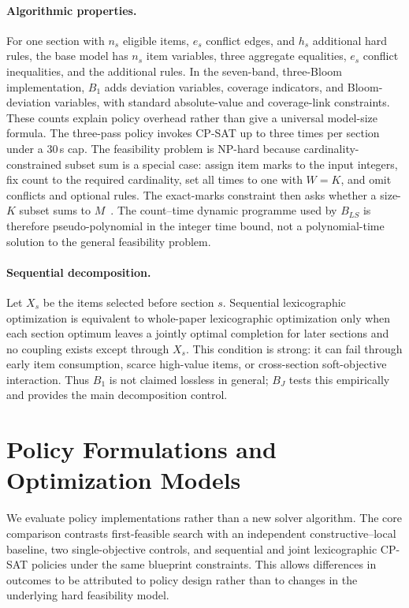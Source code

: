 \documentclass[runningheads]{llncs}
\begin{document}
\paragraph{Algorithmic properties.}
For one section with $n_s$ eligible items, $e_s$ conflict edges, and $h_s$ additional hard rules, the base model has $n_s$ item variables, three aggregate equalities, $e_s$ conflict inequalities, and the additional rules. In the seven-band, three-Bloom implementation, $B_1$ adds deviation variables, coverage indicators, and Bloom-deviation variables, with standard absolute-value and coverage-link constraints. These counts explain policy overhead rather than give a universal model-size formula. The three-pass policy invokes CP-SAT up to three times per section under a 30\,s cap.
The feasibility problem is NP-hard because cardinality-constrained subset sum is a special case: assign item marks to the input integers, fix count to the required cardinality, set all times to one with $W=K$, and omit conflicts and optional rules. The exact-marks constraint then asks whether a size-$K$ subset sums to $M$~\cite{garey1979}. The count--time dynamic programme used by $B_{LS}$ is therefore pseudo-polynomial in the integer time bound, not a polynomial-time solution to the general feasibility problem.
\paragraph{Sequential decomposition.}
Let $X_s$ be the items selected before section $s$. Sequential lexicographic optimization is equivalent to whole-paper lexicographic optimization only when each section optimum leaves a jointly optimal completion for later sections and no coupling exists except through $X_s$. This condition is strong: it can fail through early item consumption, scarce high-value items, or cross-section soft-objective interaction. Thus $B_1$ is not claimed lossless in general; $B_J$ tests this empirically and provides the main decomposition control.
\section{Policy Formulations and Optimization Models}
\label{sec:proposed}
We evaluate policy implementations rather than a new solver algorithm. The core comparison contrasts first-feasible search with an independent constructive--local baseline, two single-objective controls, and sequential and joint lexicographic CP-SAT policies under the same blueprint constraints. This allows differences in outcomes to be attributed to policy design rather than to changes in the underlying hard feasibility model.
\end{document}
